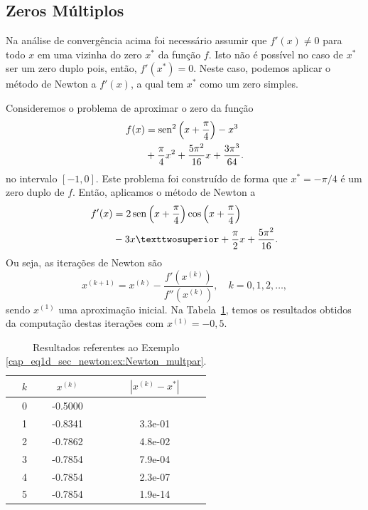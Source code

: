 \subsection{Zeros Múltiplos}

Na análise de convergência acima foi necessário assumir que $f'(x) \neq 0$ para todo $x$ em uma vizinha do zero $x^*$ da função $f$. Isto não é possível no caso de $x^*$ ser um zero duplo pois, então, $f'(x^*) = 0$. Neste caso, podemos aplicar o método de Newton a $f'(x)$, a qual tem $x^*$ como um zero simples.

\begin{ex}\label{ex:Newton_multpar}
  Consideremos o problema de aproximar o zero da função
  \begin{equation}\label{cap_eq1d_sec_newton:eq:funex}
    \begin{aligned}
      f(x) &= \operatorname{sen}^2\left(x+\frac{\pi}{4}\right) - x^3 \\
      &+ \frac{\pi}{4}x^2 + \frac{5\pi^2}{16}x + \frac{3\pi^3}{64}.
  \end{aligned}
  \end{equation}
  no intervalo $[-1,0]$. Este problema foi construído de forma que $x^* = -\pi/4$ é um zero duplo de $f$. Então, aplicamos o método de Newton a
  \begin{equation}
    \begin{aligned}
      f'(x) &= 2\sen\left(x+\frac{\pi}{4}\right)\cos\left(x+\frac{\pi}{4}\right) \\
      &- 3x² + \frac{\pi}{2}x+\frac{5\pi^2}{16}.
  \end{aligned}
  \end{equation}
Ou seja, as iterações de Newton são
\begin{equation}
  x^{(k+1)} = x^{(k)} - \frac{f'(x^{(k)})}{f''(x^{(k)})},\quad k=0, 1, 2, \ldots,
\end{equation}
sendo $x^{(1)}$ uma aproximação inicial. Na Tabela~\ref{cap_eq1d_sec_newton:tab:ex_Newton_multpar}, temos os resultados obtidos da computação destas iterações com $x^{(1)}=-0,5$.

\begin{table}[h!]
  \centering
  \caption{Resultados referentes ao Exemplo \ref{cap_eq1d_sec_newton:ex:Newton_multpar}.}
  \label{cap_eq1d_sec_newton:tab:ex_Newton_multpar}
  \begin{tabular}{r|cc}
    $k$ & $x^{(k)}$ & $|x^{(k)}-x^*|$ \\\hline
    0 & -0.5000 & \\
    1 & -0.8341 & 3.3e-01\\
    2 & -0.7862 & 4.8e-02\\
    3 & -0.7854 & 7.9e-04\\
    4 & -0.7854 & 2.3e-07\\
    5 & -0.7854 & 1.9e-14\\\hline
  \end{tabular}
\end{table}

\end{ex}

